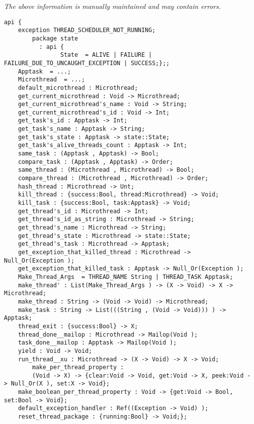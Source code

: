 \label{pkg:microthread}

{\tiny \it The above information is manually maintained and may contain errors.}
\begin{verbatim}
api {
    exception THREAD_SCHEDULER_NOT_RUNNING;
        package state
          : api {
                State  = ALIVE | FAILURE | FAILURE_DUE_TO_UNCAUGHT_EXCEPTION | SUCCESS;};;
    Apptask  = ...;
    Microthread  = ...;
    default_microthread : Microthread;
    get_current_microthread : Void -> Microthread;
    get_current_microthread's_name : Void -> String;
    get_current_microthread's_id : Void -> Int;
    get_task's_id : Apptask -> Int;
    get_task's_name : Apptask -> String;
    get_task's_state : Apptask -> state::State;
    get_task's_alive_threads_count : Apptask -> Int;
    same_task : (Apptask , Apptask) -> Bool;
    compare_task : (Apptask , Apptask) -> Order;
    same_thread : (Microthread , Microthread) -> Bool;
    compare_thread : (Microthread , Microthread) -> Order;
    hash_thread : Microthread -> Unt;
    kill_thread : {success:Bool, thread:Microthread} -> Void;
    kill_task : {success:Bool, task:Apptask} -> Void;
    get_thread's_id : Microthread -> Int;
    get_thread's_id_as_string : Microthread -> String;
    get_thread's_name : Microthread -> String;
    get_thread's_state : Microthread -> state::State;
    get_thread's_task : Microthread -> Apptask;
    get_exception_that_killed_thread : Microthread -> Null_Or(Exception );
    get_exception_that_killed_task : Apptask -> Null_Or(Exception );
    Make_Thread_Args  = THREAD_NAME String | THREAD_TASK Apptask;
    make_thread' : List(Make_Thread_Args ) -> (X -> Void) -> X -> Microthread;
    make_thread : String -> (Void -> Void) -> Microthread;
    make_task : String -> List(((String , (Void -> Void))) ) -> Apptask;
    thread_exit : {success:Bool} -> X;
    thread_done__mailop : Microthread -> Mailop(Void );
    task_done__mailop : Apptask -> Mailop(Void );
    yield : Void -> Void;
    run_thread__xu : Microthread -> (X -> Void) -> X -> Void;
        make_per_thread_property :
        (Void -> X) -> {clear:Void -> Void, get:Void -> X, peek:Void -> Null_Or(X ), set:X -> Void};
    make_boolean_per_thread_property : Void -> {get:Void -> Bool, set:Bool -> Void};
    default_exception_handler : Ref((Exception -> Void) );
    reset_thread_package : {running:Bool} -> Void;};
\end{verbatim}
